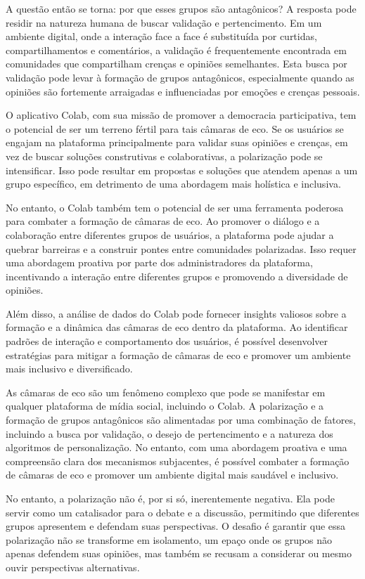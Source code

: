 A questão então se torna: por que esses grupos são antagônicos? A resposta pode residir na natureza humana de buscar validação e pertencimento. Em um ambiente digital, onde a interação face a face é substituída por curtidas, compartilhamentos e comentários, a validação é frequentemente encontrada em comunidades que compartilham crenças e opiniões semelhantes. Esta busca por validação pode levar à formação de grupos antagônicos, especialmente quando as opiniões são fortemente arraigadas e influenciadas por emoções e crenças pessoais.

O aplicativo Colab, com sua missão de promover a democracia participativa, tem o potencial de ser um terreno fértil para tais câmaras de eco. Se os usuários se engajam na plataforma principalmente para validar suas opiniões e crenças, em vez de buscar soluções construtivas e colaborativas, a polarização pode se intensificar. Isso pode resultar em propostas e soluções que atendem apenas a um grupo específico, em detrimento de uma abordagem mais holística e inclusiva.

No entanto, o Colab também tem o potencial de ser uma ferramenta poderosa para combater a formação de câmaras de eco. Ao promover o diálogo e a colaboração entre diferentes grupos de usuários, a plataforma pode ajudar a quebrar barreiras e a construir pontes entre comunidades polarizadas. Isso requer uma abordagem proativa por parte dos administradores da plataforma, incentivando a interação entre diferentes grupos e promovendo a diversidade de opiniões.

Além disso, a análise de dados do Colab pode fornecer insights valiosos sobre a formação e a dinâmica das câmaras de eco dentro da plataforma. Ao identificar padrões de interação e comportamento dos usuários, é possível desenvolver estratégias para mitigar a formação de câmaras de eco e promover um ambiente mais inclusivo e diversificado.

As câmaras de eco são um fenômeno complexo que pode se manifestar em qualquer plataforma de mídia social, incluindo o Colab. A polarização e a formação de grupos antagônicos são alimentadas por uma combinação de fatores, incluindo a busca por validação, o desejo de pertencimento e a natureza dos algoritmos de personalização. No entanto, com uma abordagem proativa e uma compreensão clara dos mecanismos subjacentes, é possível combater a formação de câmaras de eco e promover um ambiente digital mais saudável e inclusivo.

No entanto, a polarização não é, por si só, inerentemente negativa. Ela pode servir como um catalisador para o debate e a discussão, permitindo que diferentes grupos apresentem e defendam suas perspectivas. O desafio é garantir que essa polarização não se transforme em isolamento, um epaço onde os grupos não apenas defendem suas opiniões, mas também se recusam a considerar ou mesmo ouvir perspectivas alternativas.

